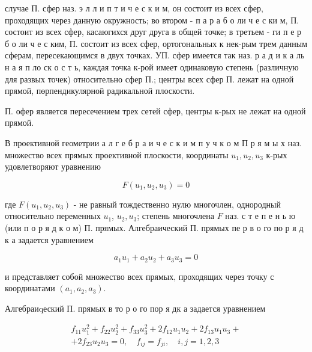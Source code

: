 \documentclass[10pt]{article}
\begin{document}
случае П. сфер наз. э л л и п т и ч е с к и м, он состоит из всех сфер, проходящих через данную окружность; во втором - п а р а б о ли ч е с ки м, П. состоит из всех сфер, касаюгихся друг друга в общей точке; в третьем - ги п е р б о ли ч е с ким, П. состоит из всех сфер, ортогональных к нек-рым трем данным сферам, пересекающимся в двух точках. УП. сфер имеется так наз. р а д и к а ль н а я п ло ск о с т ь, каждая точка к-рой имеет одинаковую степень (различную для развых точек) относительно сфер П.; центры всех сфер П. лежат на одной прямой, пөрпендикулярной радикальной плоскости.



П. офер является пересечением трех сетей сфер, центры к-рых не лежат на одной прямой.



В проективной геометрии а л г е б р а и ч е с к и м п у ч к о м П р я м ы х наз. множество всех прямых проективной плоскости, координаты $u_{1}, u_{2}, u_{3}$ к-рых удовлетворяют уравнению



\[

F\left(u_{1}, u_{2}, u_{3}\right)=0

\]



где $F\left(u_{1}, u_{2}, u_{3}\right)$ - не равный тождественно нулю многочлен, однородный относительно переменных $u_{1}$, $u_{2}, u_{3}$; степень многочлена $F$ наз. с т е п е н ь ю (или п о р я д к о м) П. прямых. Алгебраический П. прямых пе р в о го по р я д к а задается уравнением



\[

a_{1} u_{1}+a_{2} u_{2}+a_{3} u_{3}=0

\]



и представляет собой множество всех прямых, проходящих через точку с координатами $\left(a_{1}, a_{2}, a_{3}\right)$.



Алгебраиqеский П. прямых в то р о го пор я дк а задается уравнением



\[

\begin{gathered}

f_{11} u_{1}^{2}+f_{22} u_{2}^{2}+f_{33} u_{3}^{2}+2 f_{12} u_{1} u_{2}+2 f_{13} u_{1} u_{3}+ \\

+2 f_{23} u_{2} u_{3}=0, \quad f_{i j}=f_{j i}, \quad i, j=1,2,3

\end{gathered}

\]
\end{document}
